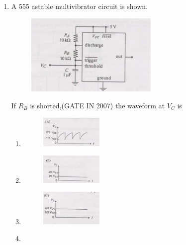 \documentclass[journal]{IEEEtran}
\begin{document}
\begin{enumerate}
\item A 555 astable multivibrator circuit is shown.  
\begin{figure}[H]
    \centering
      \includegraphics[width=0.6\textwidth]{4.jpg} 
      \caption{}
    \label{fig:fig4} 
\end{figure}
If $R_B$ is shorted,\hfill(GATE IN 2007) the waveform at $V_C$ is
\begin{multicols}{2}
\begin{enumerate}
\item \begin{figure}[H]
      \includegraphics[width=0.3\textwidth]{5.jpg} 
      \caption{}
    \label{fig:fig5} 
    \end{figure}  
\item   \begin{figure}[H]
      \includegraphics[width=0.3\textwidth]{6.jpg} 
      \caption{}
    \label{fig:fig6} 
\end{figure}
\item \begin{figure}[H]
      \includegraphics[width=0.3\textwidth]{7.jpg} 
      \caption{}
    \label{fig:fig7} 
\end{figure}
\item  \begin{figure}[H]

\end{figure}
\end{enumerate}
\end{multicols}
\end{enumerate}
\end{document}
